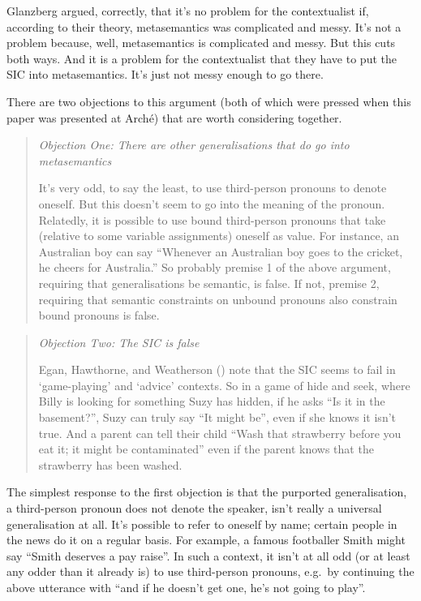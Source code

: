 \documentclass[
  11pt,
  letterpaper,
  DIV=11,
  numbers=noendperiod,
  twoside]{scrartcl}
\begin{document}
Glanzberg argued, correctly, that it's no problem for the contextualist
if, according to their theory, metasemantics was complicated and messy.
It's not a problem because, well, metasemantics is complicated and
messy. But this cuts both ways. And it is a problem for the
contextualist that they have to put the SIC into metasemantics. It's
just not messy enough to go there.

There are two objections to this argument (both of which were pressed
when this paper was presented at Arché) that are worth considering
together.

\begin{quote}
\emph{Objection One: There are other generalisations that do go into
metasemantics}

It's very odd, to say the least, to use third-person pronouns to denote
oneself. But this doesn't seem to go into the meaning of the pronoun.
Relatedly, it is possible to use bound third-person pronouns that take
(relative to some variable assignments) oneself as value. For instance,
an Australian boy can say ``Whenever an Australian boy goes to the
cricket, he cheers for Australia.'' So probably premise 1 of the above
argument, requiring that generalisations be semantic, is false. If not,
premise 2, requiring that semantic constraints on unbound pronouns also
constrain bound pronouns is false.
\end{quote}

\begin{quote}
\emph{Objection Two: The SIC is false}

Egan, Hawthorne, and Weatherson ()
note that the SIC seems to fail in `game-playing' and `advice' contexts.
So in a game of hide and seek, where Billy is looking for something Suzy
has hidden, if he asks ``Is it in the basement?'', Suzy can truly say
``It might be'', even if she knows it isn't true. And a parent can tell
their child ``Wash that strawberry before you eat it; it might be
contaminated'' even if the parent knows that the strawberry has been
washed.
\end{quote}

The simplest response to the first objection is that the purported
generalisation, a third-person pronoun does not denote the speaker,
isn't really a universal generalisation at all. It's possible to refer
to oneself by name; certain people in the news do it on a regular basis.
For example, a famous footballer Smith might say ``Smith deserves a pay
raise''. In such a context, it isn't at all odd (or at least any odder
than it already is) to use third-person pronouns, e.g.~by continuing the
above utterance with ``and if he doesn't get one, he's not going to
play''.
\end{document}
